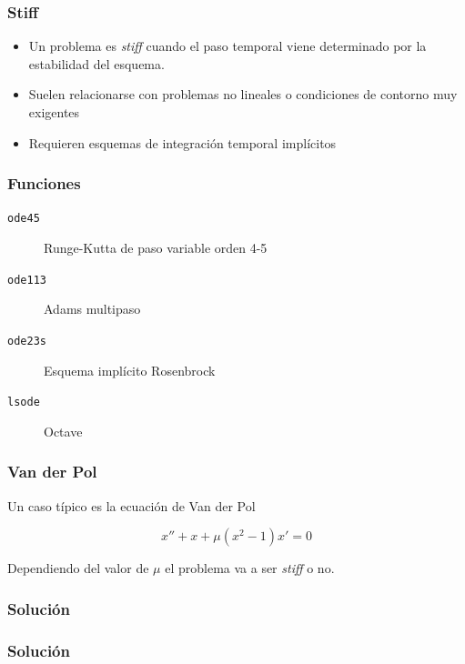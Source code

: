 \documentclass[12pt]{beamer}
\begin{document}
\begin{frame}
\frametitle{Stiff}
\begin{itemize}
\item Un problema es \emph{stiff} cuando el paso temporal viene
  determinado por la estabilidad del esquema.
\item Suelen relacionarse con problemas no lineales o condiciones de
  contorno muy exigentes
\item Requieren esquemas de integración temporal implícitos
\end{itemize}
\end{frame}

\begin{frame}
  \frametitle{Funciones}
  \begin{description}
  \item[\texttt{ode45}] Runge-Kutta de paso variable orden 4-5
  \item[\texttt{ode113}] Adams multipaso
  \item[\texttt{ode23s}] Esquema implícito Rosenbrock
  \item[\texttt{lsode}] Octave
  \end{description}
\end{frame}

\begin{frame}
  \frametitle{Van der Pol}
Un caso típico es la ecuación de Van der Pol

\[ x'' + x +\mu(x^2-1)x' = 0 \]

Dependiendo del valor de $\mu$ el problema va a ser \emph{stiff} o no.
\end{frame}


\begin{frame}\frametitle{Solución}
\testcode
\end{frame}


\begin{frame}
  \frametitle{Solución}
  \begin{figure}[h]
    \centering{}
  \end{figure}

\end{frame}

\end{document}
